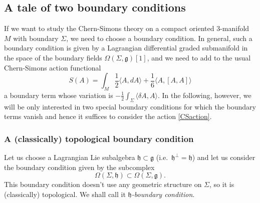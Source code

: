 \documentclass[a4paper]{amsart}
\theoremstyle{plain}
\theoremstyle{definition}
\newcommand{\g}{\mathfrak{g}}
\newcommand{\h}{\mathfrak{h}}
\newcommand{\la}{\langle}
\newcommand{\ra}{\rangle}
\begin{document}
\subsection{A tale of two boundary conditions}
If we want to study the Chern-Simons theory on a compact oriented 3-manifold $M$ with boundary $\Sigma$, we need to choose a boundary condition. In general, such a boundary condition is given by a Lagrangian differential graded submanifold in the space of the boundary fields $\Omega(\Sigma,\g)[1]$, and we need to add to the usual Chern-Simons action functional
\begin{equation}\label{CSaction}
S(A) = \int_M \frac12 \la A,dA \ra + \frac16 \la A, [A,A] \ra
\end{equation}
a boundary term whose variation is $-\frac12\int_\Sigma\la\delta A,A\ra$. %
In the following, however, we will be only interested in two special boundary conditions for which the  boundary terms  vanish and hence it suffices to consider the action \eqref{CSaction}.

\subsubsection{A (classically) topological boundary condition}
Let us choose a Lagrangian Lie subalgebra $\h\subset\g$ (i.e.\ $\h^\perp=\h$) and let us consider the boundary condition given by the subcomplex
\begin{equation}\label{h-bc}
\Omega(\Sigma,\h)\subset\Omega(\Sigma,\g).
\end{equation}
This boundary condition doesn't use any geometric structure on $\Sigma$, so it is (classically) topological. %
 We shall call it \emph{$\h$-boundary condition}.
\end{document}
